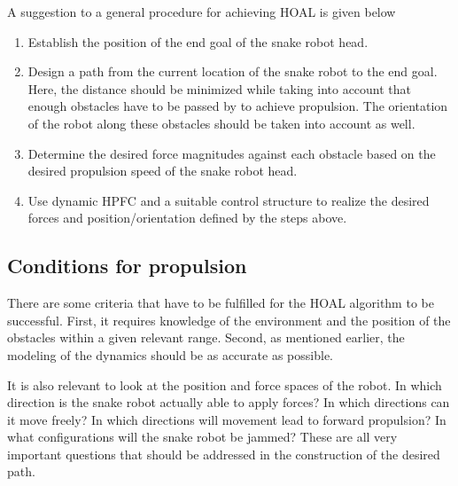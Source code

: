 
A suggestion to a general procedure for achieving HOAL is given below

\begin{enumerate}
    \item Establish the position of the end goal of the snake robot head.
    \item Design a path from the current location of the snake robot to the end goal. Here, the distance should be minimized while taking into account that enough obstacles have to be passed by to achieve propulsion. The orientation of the robot along these obstacles should be taken into account as well.
    \item Determine the desired force magnitudes against each obstacle based on the desired propulsion speed of the snake robot head.
    \item Use dynamic HPFC and a suitable control structure to realize the desired forces and position/orientation defined by the steps above.
\end{enumerate}

\subsection{Conditions for propulsion}\label{subsec:prop-conditions}

There are some criteria that have to be fulfilled for the HOAL algorithm to be successful. First, it requires knowledge of the environment and the position of the obstacles within a given relevant range. Second, as mentioned earlier, the modeling of the dynamics should be as accurate as possible.

It is also relevant to look at the position and force spaces of the robot. In which direction is the snake robot actually able to apply forces? In which directions can it move freely? In which directions will movement lead to forward propulsion? In what configurations will the snake robot be jammed? These are all very important questions that should be addressed in the construction of the desired path.

